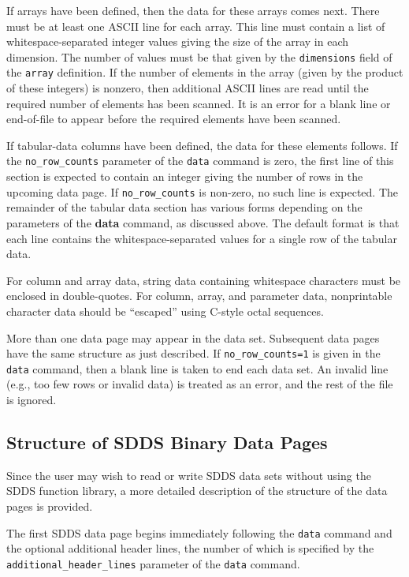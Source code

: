 \documentclass[11pt]{article}
\begin{document}
If arrays have been defined, then the data for these arrays comes next.  There must be at least one ASCII line for each array.  This line must contain a list of whitespace-separated integer values giving the size of the array in each dimension.  The number of values must be that given by the {\tt dimensions} field of the {\tt array} definition.  If the number of elements in the array (given by the product of these integers) is nonzero, then additional ASCII lines are read until the required number of elements has been scanned.  It is an error for a blank line or end-of-file to appear before the required elements have been scanned.

If tabular-data columns have been defined, the data for these elements follows. If the \verb|no_row_counts| parameter of the {\tt data} command is zero, the first line of this section is expected to contain an integer giving the number of rows in the upcoming data page.  If \verb|no_row_counts| is non-zero, no such line is expected.  The remainder of the tabular data section has various forms depending on the parameters of the {\bf data} command, as discussed above.  The default format is that each line contains the whitespace-separated values for a single row of the tabular data.  

For column and array data, string data containing whitespace characters must be enclosed in double-quotes.  For column, array, and parameter data, nonprintable character data should be ``escaped'' using C-style octal sequences.

More than one data page may appear in the data set.  Subsequent data pages have the same structure as just described. If \verb|no_row_counts=1| is given in the {\tt data} command, then a blank line is taken to end each data set.  An invalid line (e.g., too few rows or invalid data) is treated as an error, and the rest of the file is ignored.

\subsection{Structure of SDDS Binary Data Pages}

Since the user may wish to read or write SDDS data sets without using the SDDS function library, a more detailed description of the structure of the data pages is provided. 

The first SDDS data page begins immediately following the {\tt data}
command and the optional additional header lines, the number of which
is specified by the \verb|additional_header_lines| parameter of the
{\tt data} command.
\end{document}
